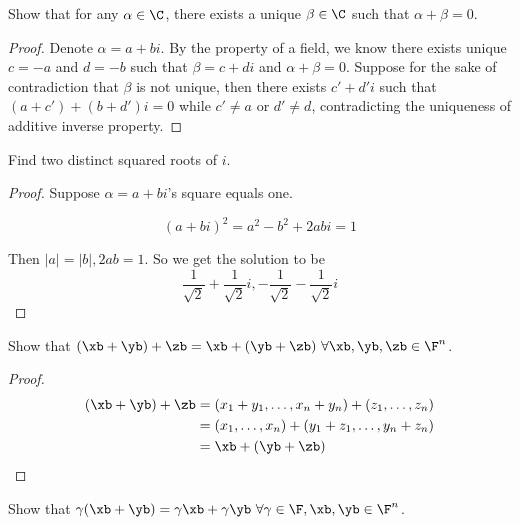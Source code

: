 \documentclass{extarticle}
\begin{document}
\begin{problem}{5}
    Show that for any \(\alpha \in \C\), there exists a unique \(\beta \in \C\) such
    that \(\alpha + \beta = 0\). 
\end{problem}

\begin{proof}
Denote \(\alpha = a + bi\). By the property of a field, we know there exists unique 
\(c = -a\) and \(d = -b\) such that \(\beta = c + di\) and \(\alpha + \beta=0\). Suppose
for the sake of contradiction that \(\beta\) is not unique, then there exists 
\(c' + d'i\) such that \((a + c') + (b + d')i = 0\) while \(c' \neq a\) or \(d' \neq d\),
contradicting the uniqueness of additive inverse property.
\end{proof}


\begin{problem}{8}
    Find two distinct squared roots of \(i\). 
\end{problem}

\begin{proof}
Suppose \(\alpha = a + bi\)'s square equals one. 

\begin{equation*}
    (a + bi)^2 = a^2 - b^2 + 2abi = 1
\end{equation*}

Then \(|a| = |b|, 2ab = 1 \). So we get the solution to be 
\[\frac{1}{\sqrt{2}} + \frac{1}{\sqrt{2}}i, -\frac{1}{\sqrt{2}} - \frac{1}{\sqrt{2}}i\] 
\end{proof}


\begin{problem}{10}
    Show that \((\xb + \yb) + \zb = \xb + (\yb + \zb) \ \forall  \xb, \yb, \zb \in \F^n\). 
\end{problem}

\begin{proof}
\begin{align*}
    (\xb + \yb) + \zb 
    &= (x_1 + y_1, \ldots, x_n + y_n) + (z_1 , \ldots, z_n) \\ 
    &= (x_1, \ldots, x_n) + (y_1 + z_1, \ldots, y_n + z_n) \\ 
    &= \xb + (\yb + \zb)
\end{align*}
\end{proof}

\begin{problem}{14}
    Show that \(\gamma(\xb + \yb) = \gamma \xb + \gamma \yb \ \forall \gamma \in \F, \xb, \yb \in \F^n\).
\end{problem}
\end{document}
